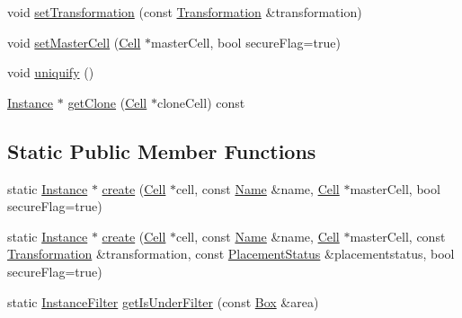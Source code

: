 \begin{DoxyCompactItemize}
\item 
void \mbox{\hyperlink{classHurricane_1_1Instance_a8890d2e1b2ba2542997454297e63512f}{set\+Transformation}} (const \mbox{\hyperlink{classHurricane_1_1Transformation}{Transformation}} \&transformation)
\item 
void \mbox{\hyperlink{classHurricane_1_1Instance_a9f626fd058c21ffc2ed5bfee8d29a853}{set\+Master\+Cell}} (\mbox{\hyperlink{classHurricane_1_1Cell}{Cell}} $\ast$master\+Cell, bool secure\+Flag=true)
\item 
void \mbox{\hyperlink{classHurricane_1_1Instance_adf28fcd01f6ff89c5435e83482f66d4c}{uniquify}} ()
\item 
\mbox{\hyperlink{classHurricane_1_1Instance}{Instance}} $\ast$ \mbox{\hyperlink{classHurricane_1_1Instance_ac5e111eef5767762e00f21fcd7a35702}{get\+Clone}} (\mbox{\hyperlink{classHurricane_1_1Cell}{Cell}} $\ast$clone\+Cell) const
\end{DoxyCompactItemize}
\subsection*{Static Public Member Functions}
\begin{DoxyCompactItemize}
\item 
static \mbox{\hyperlink{classHurricane_1_1Instance}{Instance}} $\ast$ \mbox{\hyperlink{classHurricane_1_1Instance_ae130b66536e4536ba8852fb79abfb89e}{create}} (\mbox{\hyperlink{classHurricane_1_1Cell}{Cell}} $\ast$cell, const \mbox{\hyperlink{classHurricane_1_1Name}{Name}} \&name, \mbox{\hyperlink{classHurricane_1_1Cell}{Cell}} $\ast$master\+Cell, bool secure\+Flag=true)
\item 
static \mbox{\hyperlink{classHurricane_1_1Instance}{Instance}} $\ast$ \mbox{\hyperlink{classHurricane_1_1Instance_ad5784305151e45c9d949a74bd85aaa36}{create}} (\mbox{\hyperlink{classHurricane_1_1Cell}{Cell}} $\ast$cell, const \mbox{\hyperlink{classHurricane_1_1Name}{Name}} \&name, \mbox{\hyperlink{classHurricane_1_1Cell}{Cell}} $\ast$master\+Cell, const \mbox{\hyperlink{classHurricane_1_1Transformation}{Transformation}} \&transformation, const \mbox{\hyperlink{classHurricane_1_1Instance_1_1PlacementStatus}{Placement\+Status}} \&placementstatus, bool secure\+Flag=true)
\item 
static \mbox{\hyperlink{namespaceHurricane_a889ec1441e1876d9addf89dfab32e772}{Instance\+Filter}} \mbox{\hyperlink{classHurricane_1_1Instance_ae2bc936dfecfaf70a0052959b4b2861e}{get\+Is\+Under\+Filter}} (const \mbox{\hyperlink{classHurricane_1_1Box}{Box}} \&area)
\end{DoxyCompactItemize}


